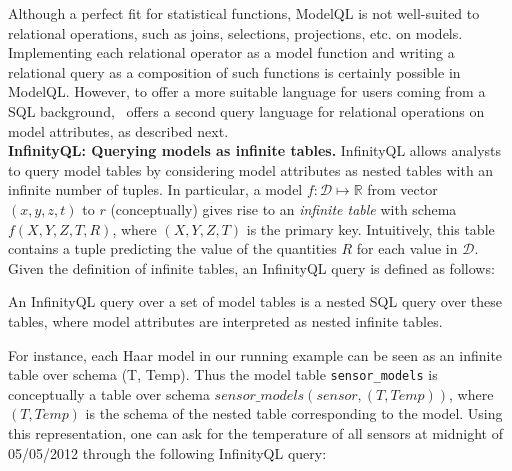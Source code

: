 Although a perfect fit for statistical functions, ModelQL is not well-suited to relational operations, such as joins, selections, projections, etc. on models. Implementing each relational operator as a model function and writing a relational query as a composition of such functions is certainly possible in ModelQL. However, to offer a more suitable language for users coming from a SQL background, \projName\ offers a second query language for relational operations on model attributes, as described next.\\

\textbf{InfinityQL: Querying models as infinite tables.} InfinityQL allows analysts to query model tables by considering model attributes as nested tables with an infinite number of tuples. In particular, a model $f: \mathcal{D} \mapsto \mathbb{R}$ from vector $(x, y, z, t)$ to $r$ (conceptually) gives rise to an \emph{infinite table} with schema $f(X, Y, Z, T, R)$, where $(X, Y, Z, T)$ is the primary key. Intuitively, this table contains a tuple predicting the value of the quantities $R$ for each value in $\mathcal{D}$. Given the definition of infinite tables, an InfinityQL query is defined as follows:

\begin{defin}
An InfinityQL query over a set of model tables is a nested SQL query over these tables, where model attributes are interpreted as nested infinite tables.
\end{defin}


\begin{example}
\label{xmpl:query-infinite-tables}
For instance, each Haar model in our running example can be seen as an infinite table over schema (T, Temp). Thus the model table \texttt{sensor\_models} is conceptually a table over schema $sensor\_models(sensor, (T, Temp))$, where $(T, Temp)$ is the schema of the nested table corresponding to the model. Using this representation, one can ask for the temperature of all sensors at midnight of 05/05/2012 through the following InfinityQL query:\\

\end{example}

